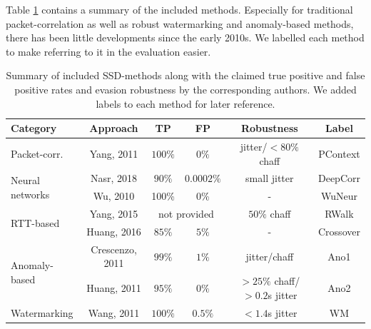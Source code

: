\documentclass[runningheads,11pt]{llncs}\usepackage[]{graphicx}\usepackage[]{color}
\begin{document}
Table \ref{Tab:Summary} contains a summary of the included methods. Especially for traditional packet-correlation as well as robust watermarking and anomaly-based methods, there has been little developments since the early 2010s.
We labelled each method to make referring to it in the evaluation easier.

\begin{table}
\centering
\begin{tabular}{l|c|c|c|c|c}
Category & Approach & TP & FP & Robustness & Label\\ \hline

Packet-corr. & Yang, 2011 \cite{yang2011correlating} & $100\%$ & $0\%$& jitter/$<80\%$ chaff & PContext\\ \hline

\multirow{2}{*}{Neural networks} & Nasr, 2018 \cite{nasr2018deepcorr} &$90\%$ & $0.0002\%$& small jitter & DeepCorr\\ \cline{2-6}
 
 & Wu, 2010 \cite{wu2010neural} & 100\% & 0\% & - & WuNeur\\ \hline
 
\multirow{2}{*}{RTT-based} & Yang, 2015 \cite{yang2015rtt}& \multicolumn{2}{c|}{not provided} & $50\%$ chaff &RWalk\\ \cline{2-6}

& Huang, 2016 \cite{huang2016detecting} & $85\%$ & $5\%$ & - & Crossover\\ \hline
 
\multirow{2}{*}{Anomaly-based} & Crescenzo, 2011 \cite{di2011detecting} & $99\%$ & $1\%$ & jitter/chaff &Ano1\\ \cline{2-6}

& Huang, 2011 \cite{huang2011detecting,ding2013detecting} & $95\%$ & $0\%$ & $>25\%$ chaff/ $>0.2$s jitter &Ano2\\ \hline

Watermarking & Wang, 2011 \cite{wang2010robust} & $100\%$ & $0.5\%$ & $<1.4$s jitter & WM\\ \hline
\end{tabular}
\caption{Summary of included SSD-methods along with the claimed true positive and false positive rates and evasion robustness by the corresponding authors. We added labels to each method for later reference.}\label{Tab:Summary}
\vspace{-0.6cm}
\end{table}


\end{document}
